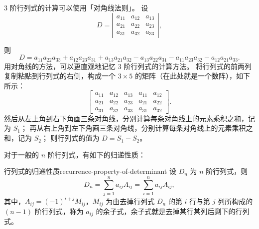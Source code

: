 $ 3 $ 阶行列式的计算可以使用「对角线法则」。
设
\begin{equation}
    D = \left| \begin{array}{ccc}
        a_{11} & a_{12} & a_{13} \\
        a_{21} & a_{22} & a_{23} \\
        a_{31} & a_{32} & a_{33}
    \end{array} \right| ,
\end{equation}

则
\begin{equation}
    D = a_{11} a_{22} a_{33} + a_{12} a_{23} a_{31} + a_{13} a_{21} a_{32} - a_{13} a_{22} a_{31} - a_{11} a_{23} a_{32} - a_{12} a_{21} a_{33} .
\end{equation}
用对角线的方法，可以更直观地记忆 $ 3 $ 阶行列式的计算方法。
将行列式的前两列复制粘贴到行列式的右侧，构成一个 $ 3 \times 5 $ 的矩阵（在此处就是一个数阵），如下所示：
\begin{equation*}
    \begin{bmatrix}
        a_{11} & a_{12} & a_{13} & a_{11} & a_{12} \\
        a_{21} & a_{22} & a_{23} & a_{21} & a_{22} \\
        a_{31} & a_{32} & a_{33} & a_{31} & a_{32}
    \end{bmatrix} .
\end{equation*}
然后从左上角到右下角画三条对角线，分别计算每条对角线上的元素乘积之和，记为 $ S_1 $；
再从右上角到左下角画三条对角线，分别计算每条对角线上的元素乘积之和，记为 $ S_2 $；
则行列式的值为 $ D = S_1 - S_2 $。

对于一般的 $ n $ 阶行列式，有如下的归递性质：
\begin{theorem}{行列式的归递性质}{recurrence-property-of-determinant}
    设 $ D_n $ 为 $ n $ 阶行列式，则
    \begin{equation}
        D_n = \sum_{j=1}^{n} a_{ij} A_{ij} = \sum_{i=1}^{n} a_{ij} A_{ij} ,
    \end{equation}
    其中，$ A_{ij} = (-1)^{i+j} M_{ij} $，$ M_{ij} $ 为由去掉行列式 $ D_n $ 的第 $ i $ 行与第 $ j $ 列所构成的 $ (n-1) $ 阶行列式，称为 $ a_{ij} $ 的余子式，余子式就是去掉某行某列后剩下的行列式。
\end{theorem}


